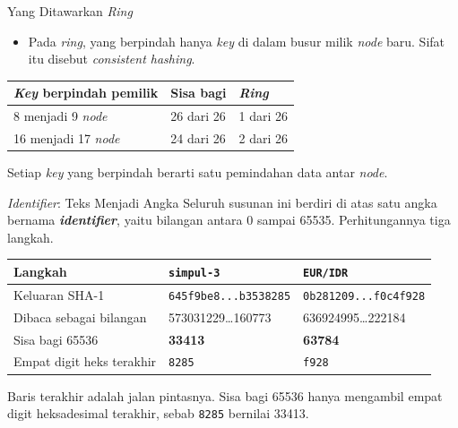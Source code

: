 \documentclass[aspectratio=169, table, 12pt]{beamer}
\begin{document}
\begin{frame}{{\Large Yang Ditawarkan \textit{Ring}}}
  \vspace{10pt}
  \begin{itemize}\small
    \item Pada \textit{ring}, yang berpindah hanya \textit{key} di dalam busur milik
          \textit{node} baru. Sifat itu disebut \textit{consistent hashing}.
  \end{itemize}

  \vspace{10pt}
  \centering
  \small
  \begin{tabularx}{0.92\textwidth}{|X|l|l|}
    \hline
    \textbf{\textit{Key} berpindah pemilik} & \textbf{Sisa bagi} & \textbf{\textit{Ring}} \\
    \hline
    8 menjadi 9 \textit{node} & 26 dari 26 & 1 dari 26 \\
    \hline
    16 menjadi 17 \textit{node} & 24 dari 26 & 2 dari 26 \\
    \hline
  \end{tabularx}

  \vspace{6pt}
  \raggedright
  {\small Setiap \textit{key} yang berpindah berarti satu pemindahan data antar
  \textit{node}.}
\end{frame}

\begin{frame}{{\Large \textit{Identifier}: Teks Menjadi Angka}}
  \vspace{6pt}
  {\small Seluruh susunan ini berdiri di atas satu angka bernama \textbf{\textit{identifier}},
  yaitu bilangan antara 0 sampai 65535. Perhitungannya tiga langkah.}
  \vspace{6pt}
  \centering
  \scriptsize
  \begin{tabularx}{0.95\textwidth}{|l|X|X|}
    \hline
    \textbf{Langkah} & \textbf{\texttt{simpul-3}} & \textbf{\texttt{EUR/IDR}} \\
    \hline
    Keluaran SHA-1 & \texttt{645f9be8...b3538285} & \texttt{0b281209...f0c4f928} \\
    \hline
    Dibaca sebagai bilangan & 573031229\dots 160773 & 636924995\dots 222184 \\
    \hline
    Sisa bagi 65536 & \textbf{33413} & \textbf{63784} \\
    \hline
    Empat digit heks terakhir & \texttt{8285} & \texttt{f928} \\
    \hline
  \end{tabularx}

  \vspace{6pt}
  {\small Baris terakhir adalah jalan pintasnya. Sisa bagi 65536 hanya mengambil
  empat digit heksadesimal terakhir, sebab \texttt{8285} bernilai 33413.}
\end{frame}
\end{document}
